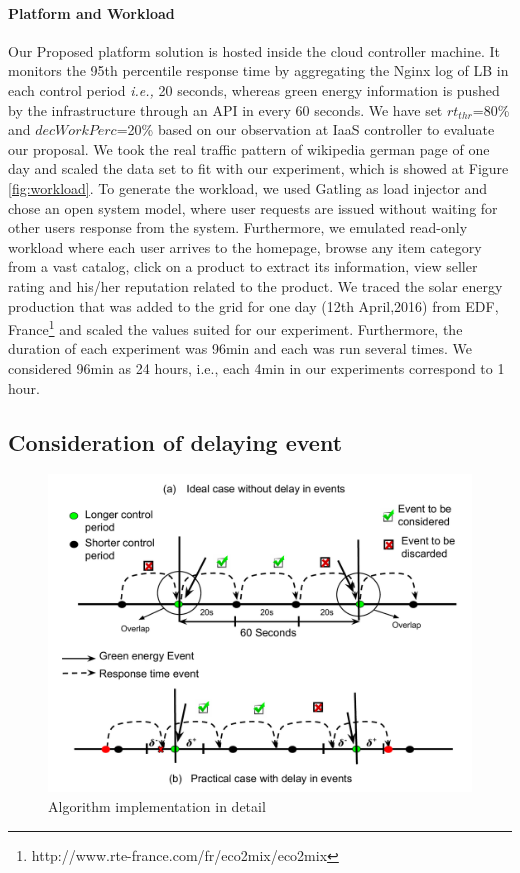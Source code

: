 \paragraph*{\textbf{Platform and Workload}} Our Proposed platform solution is hosted inside the cloud controller
machine. It monitors the 95th percentile response
time by aggregating the Nginx log of LB in each control period \emph{i.e.,} 20 seconds, whereas green energy
information is pushed by the infrastructure through an API in every 60 seconds. We have set $rt_{thr}$=80\% and $decWorkPerc$=20\% based on our observation at IaaS controller to evaluate our proposal. 
We took the real traffic pattern of wikipedia german page of one day \cite{soodeh} and scaled the data set to fit with our experiment,
which is showed at Figure \ref{fig:workload}. 
To generate the workload, we used Gatling as load injector and chose an
open system model, where user requests are issued without
waiting for other users response from the system. 
Furthermore,
we emulated read-only workload where each user arrives to the homepage, browse any item category from a
vast catalog, click on a product to extract its information,
view seller rating and his/her reputation related to the
product. 
We traced the solar energy production that was added to
the grid for one day (12th April,2016) from EDF,
France\footnote{http://www.rte-france.com/fr/eco2mix/eco2mix} and scaled the
values suited for our experiment.
Furthermore, the duration
of each experiment was 96min and each was run several
times. We considered 96min as 24 hours, i.e., each 4min in
our experiments correspond to 1 hour.


\subsection{Consideration of delaying event}


\begin{figure} [htb]
\includegraphics[scale=.35]{Graphs/implementation_UCC.pdf}
\caption{Algorithm implementation in detail}
\label{fig:implementation} 
\end{figure}

